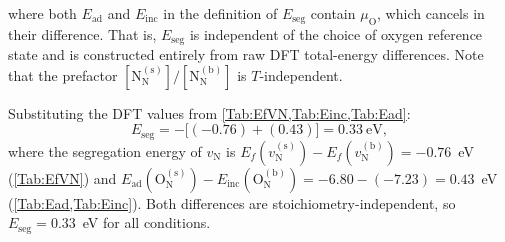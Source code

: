 \documentclass[preprint,12pt,sort&compress]{elsarticle}
\newcommand{\?}{\stackrel{?}{=}}
\begin{document}
where both $E_\text{ad}$ and $E_\text{inc}$ in the definition of $E_\text{seg}$ contain $\mu_\text{O}$, which cancels in their difference. That is, $E_\text{seg}$ is independent of the choice of oxygen reference state and is constructed entirely from raw DFT total-energy differences. Note that the prefactor $[\text{N}_\text{N}^{(\text{s})}]/[\text{N}_\text{N}^{(\text{b})}]$ is $T$-independent.


Substituting the DFT values from \cref{Tab:EfVN,Tab:Einc,Tab:Ead}:
\begin{equation}
E_\text{seg} = -\bigl[(-0.76) + (0.43)\bigr] = 0.33~\text{eV},
\label{Eq:App:EsegValue}
\end{equation}
where the segregation energy of $v_\text{N}$ is $E_f(v_\text{N}^{(\text{s})}) - E_f(v_\text{N}^{(\text{b})}) = -0.76$~eV (\cref{Tab:EfVN}) and $E_\text{ad}(\text{O}_\text{N}^{(\text{s})}) - E_\text{inc}(\text{O}_\text{N}^{(\text{b})}) = -6.80 - (-7.23) = 0.43$~eV (\cref{Tab:Ead,Tab:Einc}). Both differences are stoichiometry-independent, so $E_\text{seg} = 0.33$~eV for all conditions.
\end{document}
